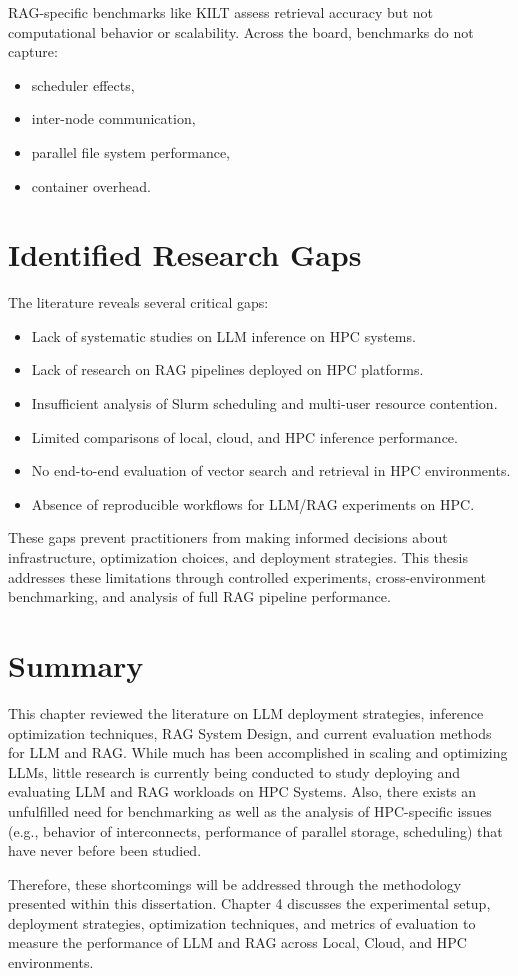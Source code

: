 RAG-specific benchmarks like \ac{KILT} assess retrieval accuracy but not computational behavior or scalability. Across the board, benchmarks do not capture:

\begin{itemize}
    \item scheduler effects,
    \item inter-node communication,
    \item parallel file system performance,
    \item container overhead.
\end{itemize}

\section{Identified Research Gaps}

The literature reveals several critical gaps:

\begin{itemize}
    \item Lack of systematic studies on \ac{LLM} inference on \ac{HPC} systems.
    \item Lack of research on \ac{RAG} pipelines deployed on \ac{HPC} platforms.
    \item Insufficient analysis of Slurm scheduling and multi-user resource contention.
    \item Limited comparisons of local, cloud, and \ac{HPC} inference performance.
    \item No end-to-end evaluation of vector search and retrieval in \ac{HPC} environments.
    \item Absence of reproducible workflows for LLM/RAG experiments on \ac{HPC}.
\end{itemize}

These gaps prevent practitioners from making informed decisions about infrastructure, optimization choices, and deployment strategies. This thesis addresses these limitations through controlled experiments, cross-environment benchmarking, and analysis of full \ac{RAG} pipeline performance.

\section{Summary}

This chapter reviewed the literature on LLM deployment strategies, inference optimization techniques, RAG System Design, and current evaluation methods for LLM and RAG. While much has been accomplished in scaling and optimizing LLMs, little research is currently being conducted to study deploying and evaluating LLM and RAG workloads on HPC Systems. Also, there exists an unfulfilled need for benchmarking as well as the analysis of HPC-specific issues (e.g., behavior of interconnects, performance of parallel storage, scheduling) that have never before been studied.

Therefore, these shortcomings will be addressed through the methodology presented within this dissertation. Chapter 4 discusses the experimental setup, deployment strategies, optimization techniques, and metrics of evaluation to measure the performance of LLM and RAG across Local, Cloud, and HPC environments.
